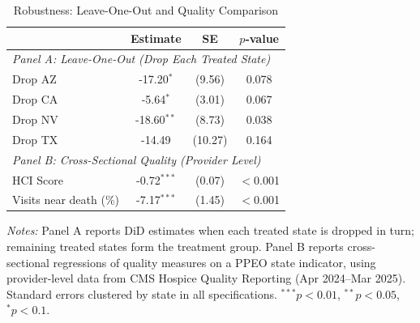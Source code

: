 \begin{table}[htbp]
\centering
\caption{Robustness: Leave-One-Out and Quality Comparison}
\label{tab:robustness}
\small
\begin{tabular}{lccc}
\toprule
 & Estimate & SE & $p$-value \\
\midrule
\multicolumn{4}{l}{\textit{Panel A: Leave-One-Out (Drop Each Treated State)}} \\[3pt]
Drop AZ & -17.20$^{*}$ & (9.56) & 0.078 \\
Drop CA & -5.64$^{*}$ & (3.01) & 0.067 \\
Drop NV & -18.60$^{**}$ & (8.73) & 0.038 \\
Drop TX & -14.49 & (10.27) & 0.164 \\
\midrule
\multicolumn{4}{l}{\textit{Panel B: Cross-Sectional Quality (Provider Level)}} \\[3pt]
HCI Score & -0.72$^{***}$ & (0.07) & $<$0.001 \\
Visits near death (\%) & -7.17$^{***}$ & (1.45) & $<$0.001 \\
\bottomrule
\end{tabular}
\vspace{0.5em}
\begin{minipage}{\textwidth}
\small \textit{Notes:} Panel A reports DiD estimates when each treated state is dropped in turn; remaining treated states form the treatment group. Panel B reports cross-sectional regressions of quality measures on a PPEO state indicator, using provider-level data from CMS Hospice Quality Reporting (Apr 2024--Mar 2025). Standard errors clustered by state in all specifications. $^{***}p<0.01$, $^{**}p<0.05$, $^{*}p<0.1$.
\end{minipage}
\end{table}
